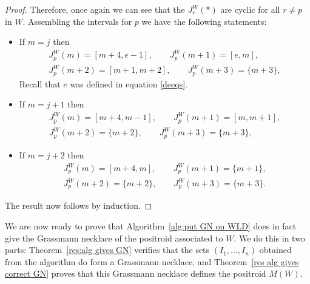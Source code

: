 \documentclass[11pt]{article}
\theoremstyle{remark}
\theoremstyle{definition}
\begin{document}
\begin{proof}
Therefore, once again we can see that the $J_r^{W}(*)$ are cyclic for all $r\neq p$ in $W$.  Assembling the intervals for $p$ we have the following statements:
\begin{itemize}
\item If $m=j$ then
\begin{gather*}J_p^{W}(m) = [m+4,e-1], \qquad  J_p^{W}(m+1) = [e,m], \\  J_p^{W}(m+2) = [m+1,m+2], \qquad  J_p^{W}(m+3) = \{m+3\},\end{gather*}
Recall that $e$ was defined in equation \eqref{deeqs}.
\item If $m=j+1$ then
\begin{gather*}J_p^{W}(m) = [m+4,m-1], \qquad J_p^{W}(m+1) = [m,m+1], \\  J_p^{W}(m+2) = \{m+2\}, \qquad  J_p^{W}(m+3) = \{m+3\},\end{gather*}
\item If $m=j+2$ then
\begin{gather*}J_p^{W}(m) = [m+4,m], \qquad  J_p^{W}(m+1) = \{m+1\}, \\  J_p^{W}(m+2) = \{m+2\}, \qquad  J_p^{W}(m+3) = \{m+3\}.\end{gather*}
\end{itemize}
The result now follows by induction.
\end{proof}
\endgroup %


We are now ready to prove that Algorithm~\ref{alg:put GN on WLD} does in fact give the Grassmann necklace of the positroid associated to $W$. We do this in two parts: Theorem~\ref{res:alg gives GN} verifies that the sets $(I_1,\dots,I_n)$ obtained from the algorithm do form a Grassmann necklace, and Theorem~\ref{res alg gives correct GN} proves that this Grassmann necklace defines the positroid $M(W)$.
\end{document}
